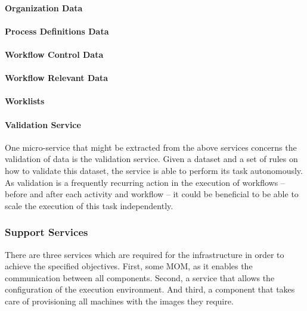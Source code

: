     \paragraph{Organization Data} %
    \label{par:organization_data}

    \paragraph{Process Definitions Data} %
    \label{par:process_definitions_data}

    \paragraph{Workflow Control Data} %
    \label{par:workflow_control_data}

    \paragraph{Workflow Relevant Data} %
    \label{par:workflow_relevant_data}

    \paragraph{Worklists} %
    \label{par:worklists}


  \paragraph{Validation Service} %
    \label{par:valitation_service}
    One micro-service that might be extracted from the above services concerns the validation of data is the validation service. Given a dataset and a set of rules on how to validate this dataset, the service is able to perform its task autonomously. As validation is a frequently recurring action in the execution of workflows -- before and after each activity and workflow -- it could be beneficial to be able to scale the execution of this task independently.

  \subsubsection{Support Services} %
  \label{ssub:support_components}
    There are three services which are required for the infrastructure in order to achieve the specified objectives. First, some \ac{MOM}, as it enables the communication between all components. Second, a service that allows the configuration of the execution environment. And third, a component that takes care of provisioning all machines with the images they require.

